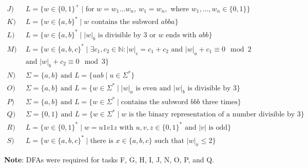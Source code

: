 \documentclass{article}
\begin{document}
\begin{align*}
    J) \ \ & L = \{ w \in \{0, 1\}^+ \mid \text{for } w=w_1 \dots w_n,\ w_1 = w_n, \text{ where } w_1, \dots, w_n \in \{0, 1\}\}\\
    K) \ \ & L = \{ w \in \{a, b\}^* \mid w \text{ contains the subword } abba \}\\
    L) \ \ & L = \{ w \in \{a, b\}^* \mid |w|_b \text{ is divisible by } 3 \text{ or }  w \text{ ends with } abb \} \\
    M) \ \ & L = \{ w \in \{a, b, c\}^* \mid \exists c_1, c_2 \in \mathbb{N}: |w|_c = c_1 + c_2 \text{ and } |w|_a + c_1 \equiv 0 \mod 2 \\
    & \text{and } |w|_b + c_2 \equiv 0 \mod 3 \} \\
    N) \ \ & \Sigma =  \{a, b\} \text{ and } L = \{uab \mid u \in \Sigma^*\} \\
    O) \ \ & \Sigma =  \{a, b\} \text{ and } L = \{w \in \Sigma^* \mid |w|_a \text{ is even and } |w|_b \text{ is divisible by } 3\} \\
    P) \ \ & \Sigma =  \{a, b\} \text{ and } L = \{ w \in \Sigma^* \mid \text{contains the subword } bbb \text{ three times} \} \\
    Q) \ \ & \Sigma = \{0,1\} \text{ and } L = \{w \in \Sigma^* \mid w \text{ is the binary representation of a number divisible by } 3\} \\
    R) \ \ & L = \{ w \in \{0,1\}^* \mid w = u1v1z \text{ with } u,v,z \in \{0,1\}^* \text{ and } |v| \text{ is odd} \} \\
    S) \ \ & L = \{w \in \{a,b,c\}^* \mid \text{there is } x \in \{a, b, c\} \text{ such that } |w|_x \leq 2\}
\end{align*}

\textbf{Note}: DFAs were required for tasks F, G, H, I, J, N, O, P, and Q.  
\end{document}
